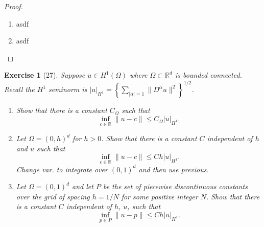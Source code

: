 \documentclass[letterpaper,twoside,11pt]{article}
\theoremstyle{mystyle}
\newtheorem*{exercise}{Exercise}
\newcommand{\R}{{\mathbb R}}
\newcommand{\cbk}{\color{black}}
\newcommand{\cblu}{\color{blue}}
\begin{document}
\cblu
\begin{proof}
  \begin{enumerate}
    \item asdf 
    \item asdf
  \end{enumerate}
\end{proof}
\cbk 







\newpage 
\begin{exercise}[27]
  Suppose $u \in H^1\left( \Omega \right)$ where $\Omega\subset \R^d$ is bounded connected. Recall the $H^1$ seminorm is $|u|_{H^1} = \left\{ \sum_{|\alpha| = 1} \|D^\alpha u \|^2 \right\}^{1/2}$. 
  \begin{enumerate}
    \item Show that there is a constant $C_\Omega$ such that 
    \[\inf_{c\in \R} \|u-c\| \leq C_\Omega |u|_{H^1}.\]
    \item Let $\Omega = \left( 0, h \right)^d$ for $h > 0$. Show that there is a constant $C$ independent of $h$ and $u$ such that 
    \[\inf_{c\in \R} \|u-c\| \leq Ch |u|_{H^1}.\]
    Change var. to integrate over $(0,1)^d$ and then use previous. 
    \item Let $\Omega = \left( 0,1 \right)^d$ and let $P$ be the set of piecewise discontinuous constants over the grid of spacing $h = 1/N$ for some positive integer $N$. Show that there is a constant $C$ independent of $h$, $u$, such that 
    \[\inf_{p\in P} \|u-p\| \leq Ch |u|_{H^1}.\]
  \end{enumerate}
\end{exercise}
\end{document}
